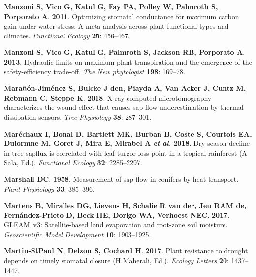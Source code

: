 \documentclass[11pt,twoside]{reedthesis}
\begin{document}
\hypertarget{ref-Manzoni2011}{}
\textbf{\textnormal{Manzoni S}, \textnormal{Vico G}, \textnormal{Katul
G}, \textnormal{Fay PA}, \textnormal{Polley W}, \textnormal{Palmroth S},
\textnormal{Porporato A}}. \textbf{2011}. Optimizing stomatal
conductance for maximum carbon gain under water stress: A meta-analysis
across plant functional types and climates. \emph{Functional Ecology}
\textbf{25}: 456--467.

\hypertarget{ref-Manzoni2013}{}
\textbf{\textnormal{Manzoni S}, \textnormal{Vico G}, \textnormal{Katul
G}, \textnormal{Palmroth S}, \textnormal{Jackson RB},
\textnormal{Porporato A}}. \textbf{2013}. Hydraulic limits on maximum
plant transpiration and the emergence of the safety-efficiency
trade-off. \emph{The New phytologist} \textbf{198}: 169--78.

\hypertarget{ref-Maranon-jimenez2018}{}
\textbf{\textnormal{Marañón-Jiménez S}, \textnormal{Bulcke J den},
\textnormal{Piayda A}, \textnormal{Van Acker J}, \textnormal{Cuntz M},
\textnormal{Rebmann C}, \textnormal{Steppe K}}. \textbf{2018}. X-ray
computed microtomography characterizes the wound effect that causes sap
flow underestimation by thermal dissipation sensors. \emph{Tree
Physiology} \textbf{38}: 287--301.

\hypertarget{ref-marechaux_dryseason_2018}{}
\textbf{\textnormal{Maréchaux I}, \textnormal{Bonal D},
\textnormal{Bartlett MK}, \textnormal{Burban B}, \textnormal{Coste S},
\textnormal{Courtois EA}, \textnormal{Dulormne M}, \textnormal{Goret J},
\textnormal{Mira E}, \textnormal{Mirabel A} \emph{et al.}}
\textbf{2018}. Dry‐season decline in tree sapflux is correlated with
leaf turgor loss point in a tropical rainforest (A Sala, Ed.).
\emph{Functional Ecology} \textbf{32}: 2285--2297.

\hypertarget{ref-Marshall1958}{}
\textbf{\textnormal{Marshall DC}}. \textbf{1958}. Measurement of sap
flow in conifers by heat transport. \emph{Plant Physiology} \textbf{33}:
385--396.

\hypertarget{ref-Martens2017}{}
\textbf{\textnormal{Martens B}, \textnormal{Miralles DG},
\textnormal{Lievens H}, \textnormal{Schalie R van der}, \textnormal{Jeu
RAM de}, \textnormal{Fernández-Prieto D}, \textnormal{Beck HE},
\textnormal{Dorigo WA}, \textnormal{Verhoest NEC}}. \textbf{2017}.
GLEAM~v3: Satellite-based land evaporation and root-zone soil moisture.
\emph{Geoscientific Model Development} \textbf{10}: 1903--1925.

\hypertarget{ref-martin-stpaul2017}{}
\textbf{\textnormal{Martin-StPaul N}, \textnormal{Delzon S},
\textnormal{Cochard H}}. \textbf{2017}. Plant resistance to drought
depends on timely stomatal closure (H Maherali, Ed.). \emph{Ecology
Letters} \textbf{20}: 1437--1447.
\end{document}
